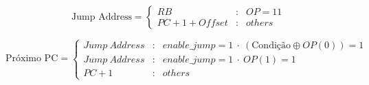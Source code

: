 \[\text{Jump Address}=\left\{
	\begin{array}{rcl}
	RB & : & OP=11\\
	PC+1+Offset & : & others
	\end{array}\right.\]

\[\text{Próximo PC}=\left\{
	\begin{array}{rcl}
	Jump\ Address & : & enable\_jump=1\ \cdot\ (\text{Condição} \oplus OP(0))=1\\
	Jump\ Address & : & enable\_jump=1\ \cdot\ OP(1)=1\\
	PC+1 & : & others
	\end{array}\right.\]